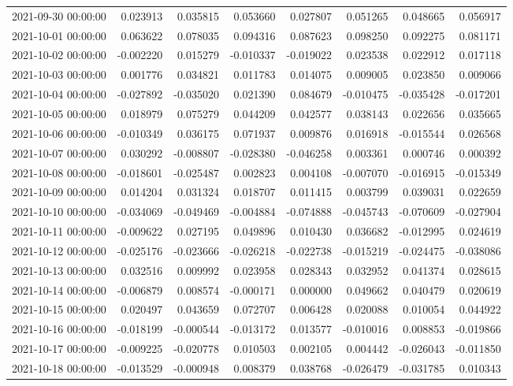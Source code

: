 \begin{tabular}{lrrrrrrr}
2021-09-30 00:00:00 & 0.023913 & 0.035815 & 0.053660 & 0.027807 & 0.051265 & 0.048665 & 0.056917 \\
2021-10-01 00:00:00 & 0.063622 & 0.078035 & 0.094316 & 0.087623 & 0.098250 & 0.092275 & 0.081171 \\
2021-10-02 00:00:00 & -0.002220 & 0.015279 & -0.010337 & -0.019022 & 0.023538 & 0.022912 & 0.017118 \\
2021-10-03 00:00:00 & 0.001776 & 0.034821 & 0.011783 & 0.014075 & 0.009005 & 0.023850 & 0.009066 \\
2021-10-04 00:00:00 & -0.027892 & -0.035020 & 0.021390 & 0.084679 & -0.010475 & -0.035428 & -0.017201 \\
2021-10-05 00:00:00 & 0.018979 & 0.075279 & 0.044209 & 0.042577 & 0.038143 & 0.022656 & 0.035665 \\
2021-10-06 00:00:00 & -0.010349 & 0.036175 & 0.071937 & 0.009876 & 0.016918 & -0.015544 & 0.026568 \\
2021-10-07 00:00:00 & 0.030292 & -0.008807 & -0.028380 & -0.046258 & 0.003361 & 0.000746 & 0.000392 \\
2021-10-08 00:00:00 & -0.018601 & -0.025487 & 0.002823 & 0.004108 & -0.007070 & -0.016915 & -0.015349 \\
2021-10-09 00:00:00 & 0.014204 & 0.031324 & 0.018707 & 0.011415 & 0.003799 & 0.039031 & 0.022659 \\
2021-10-10 00:00:00 & -0.034069 & -0.049469 & -0.004884 & -0.074888 & -0.045743 & -0.070609 & -0.027904 \\
2021-10-11 00:00:00 & -0.009622 & 0.027195 & 0.049896 & 0.010430 & 0.036682 & -0.012995 & 0.024619 \\
2021-10-12 00:00:00 & -0.025176 & -0.023666 & -0.026218 & -0.022738 & -0.015219 & -0.024475 & -0.038086 \\
2021-10-13 00:00:00 & 0.032516 & 0.009992 & 0.023958 & 0.028343 & 0.032952 & 0.041374 & 0.028615 \\
2021-10-14 00:00:00 & -0.006879 & 0.008574 & -0.000171 & 0.000000 & 0.049662 & 0.040479 & 0.020619 \\
2021-10-15 00:00:00 & 0.020497 & 0.043659 & 0.072707 & 0.006428 & 0.020088 & 0.010054 & 0.044922 \\
2021-10-16 00:00:00 & -0.018199 & -0.000544 & -0.013172 & 0.013577 & -0.010016 & 0.008853 & -0.019866 \\
2021-10-17 00:00:00 & -0.009225 & -0.020778 & 0.010503 & 0.002105 & 0.004442 & -0.026043 & -0.011850 \\
2021-10-18 00:00:00 & -0.013529 & -0.000948 & 0.008379 & 0.038768 & -0.026479 & -0.031785 & 0.010343 \\

\end{tabular}
